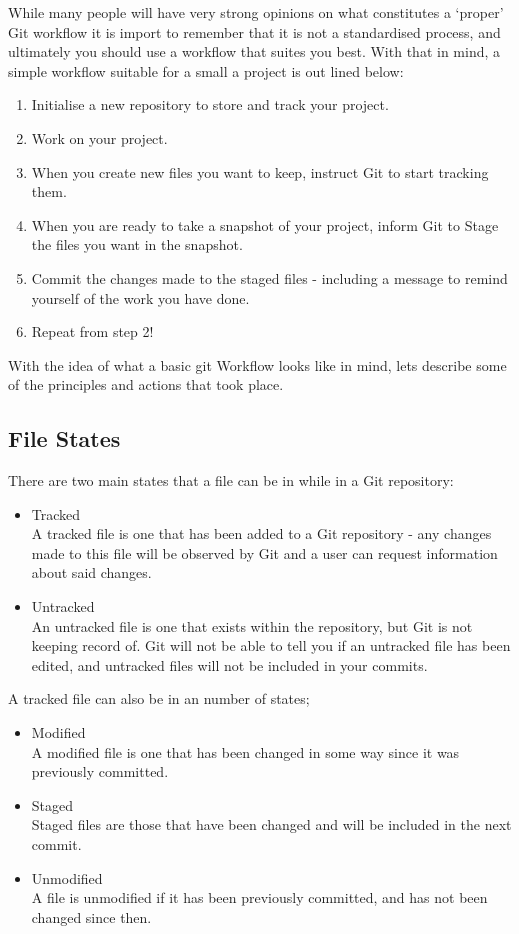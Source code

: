\documentclass[11pt, a4paper, titlepage]{article}
\begin{document}
While many people will have very strong opinions on what constitutes a
`proper' Git workflow it is import to remember that it is not a standardised
process, and ultimately you should use a workflow that suites you best.
With that in mind, a simple workflow suitable for a small a project is out
lined below:

\begin{enumerate}
\item Initialise a new repository to store and track your project.
\item Work on your project.
\item When you create new files you want to keep, instruct Git to start
tracking them.
\item When you are ready to take a snapshot of your project, inform Git to
Stage the files you want in the snapshot.
\item Commit the changes made to the staged files - including a message to
remind yourself of the work you have done.
\item Repeat from step 2!
\end{enumerate}

With the idea of what a basic git Workflow looks like in mind, lets describe
some of the principles and actions that took place.

\subsection{File States}
There are two  main states that a file can be in while in a Git repository:
\begin{itemize}
\item Tracked\\
A tracked file is one that has been added to a Git repository
- any changes made to this file will be observed by Git and a user can request
  information about said changes.
\item Untracked\\
An untracked file is one that exists within the repository, but Git is not
keeping record of.
Git will not be able to tell you if an untracked file has been edited, and
untracked files will not be included in your commits.
\end{itemize}

A tracked file can also be in an number of states;
\begin{itemize}
\item Modified\\ 
A modified file is one that has been changed in some way since it was
previously committed.
\item Staged\\
Staged files are those that have been changed and will be included in the next
commit.
\item Unmodified\\
A file is unmodified if it has been previously committed, and has not been
changed since then.
\end{itemize}
\end{document}

